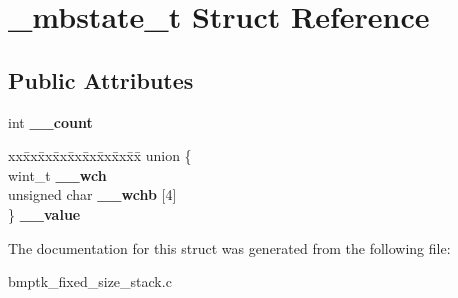 \hypertarget{struct__mbstate__t}{}\section{\+\_\+mbstate\+\_\+t Struct Reference}
\label{struct__mbstate__t}
\subsection*{Public Attributes}
\begin{DoxyCompactItemize}
\item 
int {\bfseries \+\_\+\+\_\+count}\hypertarget{struct__mbstate__t_a6261817a0f58d2907e29e39413049b6c}{}\label{struct__mbstate__t_a6261817a0f58d2907e29e39413049b6c}

\item 
\begin{tabbing}
xx\=xx\=xx\=xx\=xx\=xx\=xx\=xx\=xx\=\kill
union \{\\
\>wint\_t {\bfseries \_\_wch}\\
\>unsigned char {\bfseries \_\_wchb} \mbox{[}4\mbox{]}\\
\} {\bfseries \_\_value}\hypertarget{struct__mbstate__t_a35ff2300741ab0d3fc3f0a7a15e2cbf4}{}\label{struct__mbstate__t_a35ff2300741ab0d3fc3f0a7a15e2cbf4}
\\

\end{tabbing}\end{DoxyCompactItemize}


The documentation for this struct was generated from the following file\+:\begin{DoxyCompactItemize}
\item 
bmptk\+\_\+fixed\+\_\+size\+\_\+stack.\+c\end{DoxyCompactItemize}
